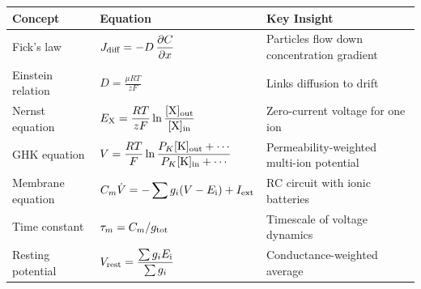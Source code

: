 \begin{chaptersummary}

\begin{center}
\renewcommand{\arraystretch}{1.6}
\begin{tabularx}{\textwidth}{@{}l X X@{}}
  \toprule
  \textbf{Concept} & \textbf{Equation} & \textbf{Key Insight} \\
  \midrule
  Fick's law &
  $\displaystyle J_{\text{diff}} = -D\,\frac{\partial C}{\partial x}$ &
  Particles flow down concentration gradient \\
  Einstein relation &
  $\displaystyle D = \frac{\mu RT}{zF}$ &
  Links diffusion to drift \\
  Nernst equation &
  $\displaystyle E_{\mathrm{X}} = \frac{RT}{zF}\ln\frac{[\mathrm{X}]_{\text{out}}}{[\mathrm{X}]_{\text{in}}}$ &
  Zero-current voltage for one ion \\
  GHK equation &
  $\displaystyle V = \frac{RT}{F}\ln\frac{P_K[\mathrm{K}]_{\text{out}}+\cdots}{P_K[\mathrm{K}]_{\text{in}}+\cdots}$ &
  Permeability-weighted multi-ion potential \\
  Membrane equation &
  $\displaystyle C_m\dot{V} = -\sum g_i(V-E_{\mathrm{i}}) + I_{\text{ext}}$ &
  RC circuit with ionic batteries \\
  Time constant &
  $\displaystyle \tau_m = C_m / g_{\text{tot}}$ &
  Timescale of voltage dynamics \\
  Resting potential &
  $\displaystyle V_{\text{rest}} = \frac{\sum g_i E_{\mathrm{i}}}{\sum g_i}$ &
  Conductance-weighted average \\
  \bottomrule
\end{tabularx}
\end{center}

\end{chaptersummary}

